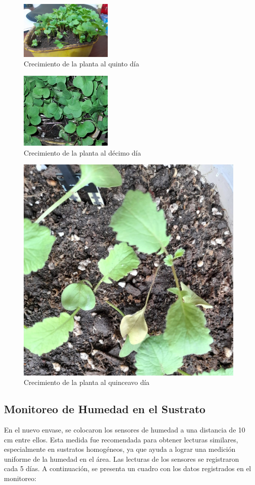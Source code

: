 \documentclass[conference]{IEEEtran}
\begin{document}
	\begin{figure}[h]
		\centering
		\includegraphics[width=0.4\textwidth]{media/Dia 5.jpg}
		\caption{Crecimiento de la planta al quinto día}
		\label{fig:raphanus-dia5}
	\end{figure}
	
	\begin{figure}[h]
		\centering
		\includegraphics[width=0.4\textwidth]{media/Dia 10.jpg}
		\caption{Crecimiento de la planta al décimo día}
		\label{fig:raphanus-dia10}
	\end{figure}
	
	\begin{figure}[h]
		\centering
		\includegraphics[width=0.5\linewidth]{media/Dia 15 .jpg}
		\caption{Crecimiento de la planta al quinceavo día}
		\label{fig:raphanus-dia15}
	\end{figure}
	
	\subsection{Monitoreo de Humedad en el Sustrato}
	En el nuevo envase, se colocaron los sensores de humedad a una distancia de 10 cm entre ellos. Esta medida fue recomendada para obtener lecturas similares, especialmente en sustratos homogéneos, ya que ayuda a lograr una medición uniforme de la humedad en el área.
	Las lecturas de los sensores se registraron cada 5 días. A continuación, se presenta un cuadro con los datos registrados en el monitoreo:
	
\end{document}
